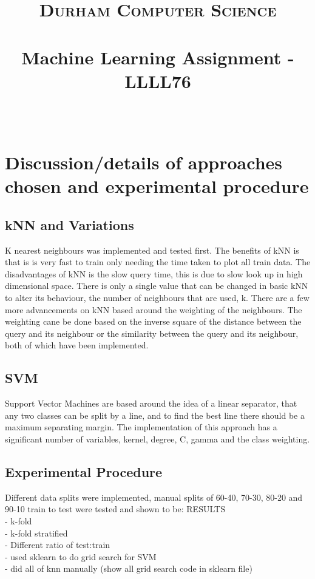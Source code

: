 \documentclass[paper=a4, fontsize=11pt]{scrartcl}
\date{}
\title{
		\vspace{-0.5in} 	
		\usefont{OT1}{bch}{b}{n}
		\normalfont \normalsize \textsc{Durham Computer Science} \\ [5pt]
		\horrule{0.5pt} \\[0.4cm]
		\huge Machine Learning Assignment - LLLL76\\
		\horrule{2pt} \\[0.5cm]
		\vspace{-1in} 	
}
\numberwithin{equation}{section}		%
\numberwithin{figure}{section}			%
\numberwithin{table}{section}				%
\begin{document}
\maketitle
\section{Discussion/details of approaches chosen and experimental procedure}

\subsection{kNN and Variations}

K nearest neighbours was implemented and tested first. The benefits of kNN is that is is very fast to train only needing the time taken to plot all train data. The disadvantages of kNN is the slow query time, this is due to slow look up in high dimensional space. There is only a single value that can be changed in basic kNN to alter its behaviour, the number of neighbours that are used, k. There are a few more advancements on kNN based around the weighting of the neighbours. The weighting cane be done based on the inverse square of the distance between the query and its neighbour or the similarity between the query and its neighbour, both of which have been implemented.

\subsection{SVM}

Support Vector Machines are based around the idea of a linear separator, that any two classes can be split by a line, and to find the best line there should be a maximum separating margin. The implementation of this approach has a significant number of variables, kernel, degree, C, gamma and the class weighting.

\subsection{Experimental Procedure}

Different data splits were implemented, manual splits of 60-40, 70-30, 80-20 and 90-10 train to test were tested and shown to be: RESULTS\\
- k-fold\\
- k-fold stratified\\
- Different ratio of test:train\\
- used sklearn to do grid search for SVM\\
- did all of knn manually (show all grid search code in sklearn file)
\end{document}

